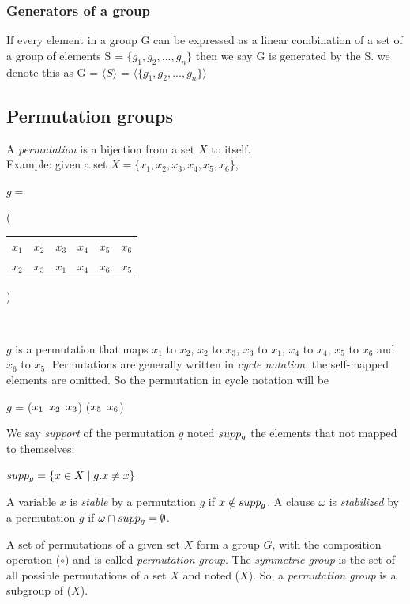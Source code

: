 \subsubsection{Generators of a group}
If every element in a group G can be expressed as a linear combination
of a set of a group of elements S = $\{g_1, g_2, ..., g_n \}$ then we say G is 
generated by the S. we denote this as G = $\langle S \rangle$ =
$\langle \{g_1, g_2, ..., g_n \} \rangle$ 

\subsection{Permutation groups}
A \emph{permutation} is a bijection from a set $X$ to itself.\\
Example: given a set $X = \{x_1, x_2, x_3, x_4, x_5, x_6\}$,
\begin{center}
$g = ${\Bigg( \begin{tabular}{cccccc}
  $x_1$ & $x_2$ & $x_3$ & $x_4$ & $x_5$ & $x_6$\\
  $x_2$ & $x_3$ & $x_1$ & $x_4$ & $x_6$ & $x_5$
 \end{tabular} \Bigg)}\\
\end{center}
$g$ is a permutation that maps $x_1$ to $x_2$, $x_2$ to $x_3$, $x_3$ to $x_1$, $x_4$ to $x_4$, $x_5$ to $x_6$ and $x_6$ to $x_5$.
Permutations are generally written in \emph{cycle notation}, the self-mapped elements are omitted.
So the permutation in cycle notation will be 
\begin{center}
 $g$ = ($x_1 \enskip x_2 \enskip x_3$) ($x_5 \enskip x_6$)
\end{center}
We say \emph{support} of the permutation $g$ noted $supp_{g}$ the elements that not mapped to themselves:
\begin{center}
 $supp_{g} = \{ x \in X \mid g.x \neq x\}$
\end{center}
A variable $x$ is \emph{stable} by a permutation $g$ 
if $x \notin supp_g$. A clause $\omega$ is \emph{stabilized} by a permutation $g$ if 
$\omega \cap supp_g = \emptyset$.

A set of permutations of a given set $X$ form a group $G$,
with the composition operation ($\circ$) and is called \emph{permutation group}.
The \emph{symmetric group} is the set of all possible permutations of a set $X$ and noted \Group($X$).
So, a \emph{permutation group} is a subgroup of \Group($X$). 

